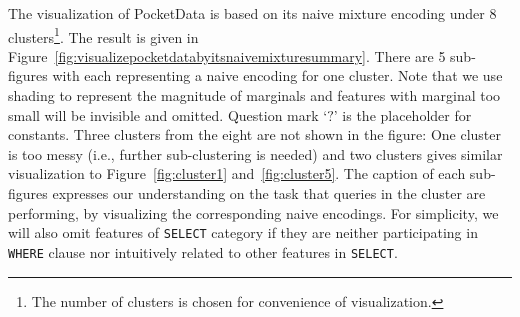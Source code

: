 The visualization of PocketData is based on its naive mixture encoding under $8$ clusters\footnote{The number of clusters is chosen for convenience of visualization.}. 
The result is given in Figure~\ref{fig:visualizepocketdatabyitsnaivemixturesummary}.
There are 5 sub-figures with each representing a naive encoding for one cluster. 
Note that we use shading to represent the magnitude of marginals and features with marginal too small will be invisible and omitted.
Question mark `$?$' is the placeholder for constants.
Three clusters from the eight are not shown in the figure: One cluster is too messy (i.e., further sub-clustering is needed) and two clusters gives similar visualization to Figure~\ref{fig:cluster1} and~\ref{fig:cluster5}.
The caption of each sub-figures expresses our understanding on the task that queries in the cluster are performing, by visualizing the corresponding naive encodings.
For simplicity, we will also omit features of \texttt{SELECT} category if they are neither participating in \texttt{WHERE} clause nor intuitively related to other features in \texttt{SELECT}. 
